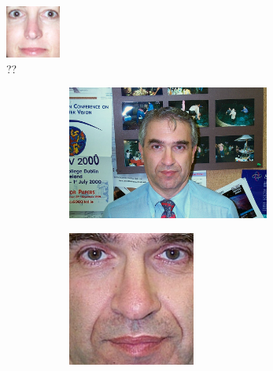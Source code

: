 


\begin{figure}[H]
\centering
\includegraphics[width=0.16\textwidth]{img/fd2/output12.png}
\caption{??}
\label{fig:fdResult}
\end{figure}



\begin{figure}[H]
\centering

\begin{subfigure}{0.65\textwidth}
\begin{subfigure}{.33\textwidth}
  \centering
  \includegraphics[width=0.95\textwidth]{img/fdResult1/input63.png}
  \caption{}
\end{subfigure}%
\begin{subfigure}{.33\textwidth}
  \centering
  \includegraphics[width=0.6\textwidth]{img/fdResult1/output63.png}

\end{subfigure}
\end{subfigure}
\end{figure}
